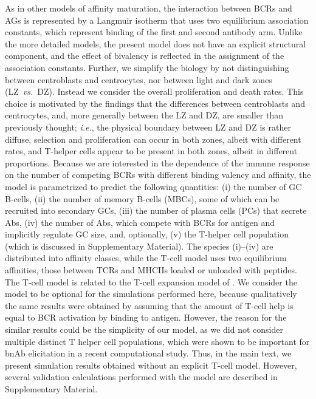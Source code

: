 \documentclass[utf8]{frontiersHLTH}%
\newcommand{\cred}[1]{#1} %
\newcommand{\vo}[1]{#1} %
\def\ie {{\it i.e.}}
\def\vs {{\it vs.}}
\newcommand{\SI}{Supplementary Material}
\begin{document}
As in other models of affinity maturation,\cite{zhang10,wang15} the
interaction between BCRs and AGs is represented by a Langmuir
isotherm that uses two equilibrium association constants, which represent
binding of the first and second antibody arm.  
Unlike the more detailed models,\cite{robert18,amitai20} 
the present model does not have an explicit structural component,
and the effect of bivalency is reflected in the assignment of the association constants.
Further, we simplify the \vo{biology} by not distinguishing between centroblasts and centrocytes, nor
between light and dark zones (LZ~\vs~DZ).  Instead we consider the overall
proliferation and death rates. This choice is motivated by the findings
that the differences between centroblasts and centrocytes, and, more
generally between the LZ and DZ, are smaller than previously
thought;\cite{allen07} \ie, the physical boundary between LZ and DZ is
rather diffuse, selection and proliferation can occur in both zones,
albeit with different rates, and T-helper cells appear to be present in
both zones, albeit in different proportions. Because we are interested
in the dependence of the immune response on the
number of competing BCRs with different binding valency and affinity, the model is parametrized
to \vo{predict} the following quantities: (i) the number of GC B-cells, (ii) the
number of memory
B-cells (MBCs), some of which can be recruited into secondary GCs, (iii) the
number of plasma
cells (PCs) that secrete Abs, (iv) the number of Abs, which compete with BCRs for
antigen and implicitly regulate GC size,\cite{zhang13} and, optionally, (v) the T-helper cell
population (which is discussed in \SI). The species (i)--(iv) are distributed into affinity classes,
while the T-cell model uses two equilibrium affinities, those between TCRs
and MHCIIs loaded or unloaded with peptides. The T-cell model is related
to the T-cell expansion model of \citet{mayer19}.  We consider the model to be 
optional for the simulations performed here, because \cred{qualitatively the
same results were obtained by assuming that the amount of T-cell help is
equal to BCR activation by binding to antigen.  However, the reason for the 
similar results could be the simplicity of our model, as we did not consider
multiple distinct T helper cell populations, which were shown to be important for bnAb elicitation in a recent computational study.\cite{erwin20}}
%
\cred{Thus, in the main text, we present simulation results obtained without an explicit T-cell model.
However, several validation calculations performed with the model are described in \SI.}
\end{document}
